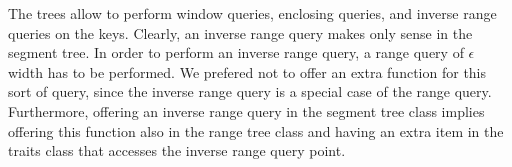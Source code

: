 %


The trees allow to perform
window queries, enclosing queries, and inverse range queries on
the keys. Clearly, an inverse range query makes only sense in the
segment tree.
In order to perform an inverse range query, a range query of
$\epsilon$ width has to be performed. We prefered not to offer an
extra function for this sort of query, since the inverse range
query is a special case of the range query. Furthermore, offering
an inverse range query in the segment tree class implies offering this
function also in the range tree class and having an extra item in
the traits class that accesses the inverse range query point.

